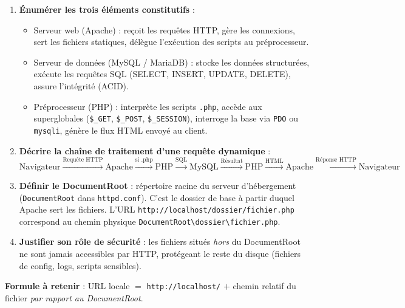 \documentclass[11pt]{article}
\newcommand{\cle}[1]{{\popxbold\color{popdark}#1}}
\begin{document}
\begin{methode}
\begin{enumerate}
\item \textbf{Énumérer les trois éléments constitutifs} :
\begin{itemize}
\item \cle{Serveur web} (\cle{Apache}) : reçoit les requêtes HTTP, gère les connexions, sert les fichiers statiques, délègue l'exécution des scripts au préprocesseur.
\item \cle{Serveur de données} (\cle{MySQL} / \cle{MariaDB}) : stocke les données structurées, exécute les requêtes \cle{SQL} (SELECT, INSERT, UPDATE, DELETE), assure l'intégrité (ACID).
\item \cle{Préprocesseur} (\cle{PHP}) : interprète les scripts \texttt{.php}, accède aux superglobales (\texttt{\$\_GET}, \texttt{\$\_POST}, \texttt{\$\_SESSION}), interroge la base via \texttt{PDO} ou \texttt{mysqli}, génère le flux HTML envoyé au client.
\end{itemize}
\item \textbf{Décrire la chaîne de traitement d'une requête dynamique} :
\[
\text{Navigateur} \xrightarrow{\text{Requête HTTP}} \text{Apache} \xrightarrow{\text{si .php}} \text{PHP} \xrightarrow{\text{SQL}} \text{MySQL} \xrightarrow{\text{Résultat}} \text{PHP} \xrightarrow{\text{HTML}} \text{Apache} \xrightarrow{\text{Réponse HTTP}} \text{Navigateur}
\]
\item \textbf{Définir le DocumentRoot} : répertoire racine du serveur d'hébergement (\texttt{DocumentRoot} dans \texttt{httpd.conf}). C'est le dossier de base à partir duquel Apache sert les fichiers. L'URL \texttt{http://localhost/dossier/fichier.php} correspond au chemin physique \texttt{DocumentRoot\textbackslash dossier\textbackslash fichier.php}.
\item \textbf{Justifier son rôle de sécurité} : les fichiers situés \emph{hors} du DocumentRoot ne sont jamais accessibles par HTTP, protégeant le reste du disque (fichiers de config, logs, scripts sensibles).
\end{enumerate}
\textbf{Formule à retenir} : URL locale $=$ \texttt{http://localhost/} $+$ chemin relatif du fichier \emph{par rapport au DocumentRoot}.
\end{methode}
\end{document}
